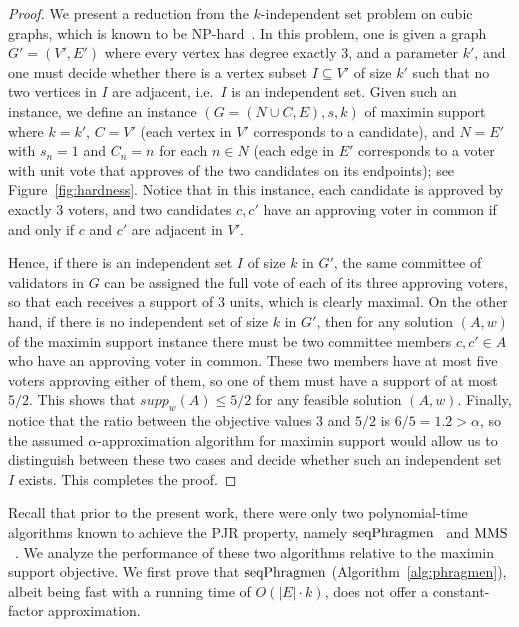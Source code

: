 \begin{proof}
We present a reduction from the $k$-independent set problem on cubic graphs, which is known to be NP-hard~\cite{johnson1979computers}. In this problem, one is given a graph $G'=(V',E')$ where every vertex has degree exactly 3, and a parameter $k'$, and one must decide whether there is a vertex subset $I\subseteq V'$ of size $k'$ such that no two vertices in $I$ are adjacent, i.e.~$I$ is an independent set. 
Given such an instance, we define an instance $(G=(N\cup C, E), s, k)$ of maximin support where $k=k'$, $C=V'$ (each vertex in $V'$ corresponds to a candidate), and $N=E'$ with $s_n=1$ and $C_n=n$ for each $n\in N$ (each edge in $E'$ corresponds to a voter with unit vote that approves of the two candidates on its endpoints); see Figure~\ref{fig:hardness}.
Notice that in this instance, each candidate is approved by exactly 3 voters, and two candidates $c, c'$ have an approving voter in common if and only if $c$ and $c'$ are adjacent in $V'$.

Hence, if there is an independent set $I$ of size $k$ in $G'$, the same committee of validators in $G$ can be assigned the full vote of each of its three approving voters, so that each receives a support of 3 units, which is clearly maximal. On the other hand, if there is no independent set of size $k$ in $G'$, then for any solution $(A,w)$ of the maximin support instance there must be two committee members $c,c'\in A$ who have an approving voter in common. These two members have at most five voters approving either of them, so one of them must have a support of at most $5/2$. This shows that $supp_w(A)\leq 5/2$ for any feasible solution $(A,w)$. Finally, notice that the ratio between the objective values $3$ and $5/2$ is $6/5=1.2>\alpha$, so the assumed $\alpha$-approximation algorithm for maximin support would allow us to distinguish between these two cases and decide whether such an independent set $I$ exists. This completes the proof.
\end{proof}

Recall that prior to the present work, there were only two polynomial-time algorithms known to achieve the PJR property, namely $\operatorname{seqPhragmen}$~\cite{brill2017phragmen} and $\operatorname{MMS}$~\cite{sanchez2016maximin}. 
We analyze the performance of these two algorithms relative to the maximin support objective. 
We first prove that $\operatorname{seqPhragmen}$ (Algorithm~\ref{alg:phragmen}), albeit being fast with a running time of $O(|E|\cdot k)$, does not offer a constant-factor approximation. 

